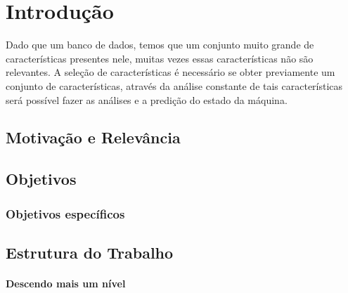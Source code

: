 \chapter{Introdução}
\begin{comment}
Segundo \cite{horn86robot}, todo triângulo equilátero tem os lados iguais. Já
segundo \cite{shashua97photometric}, todo quadrado também tem. \cite{Li2009}

Veja que o pacote \verb|natbib| permite uma série de formas diferentes para
fazer referências bibliográficas. O comando padrão, \verb|\cite|, realiza a
citação comum vista no parágrafo anterior. Outros comandos permitem, por
exemplo, citar somente o autor --- por exemplo, citar o trabalho de
\citeauthor{samaras99coupled} --- ou colocar automaticamente a citação entre
parênteses \citep{hougen93estimation, sato99illumination2, sato99illumination1,
sato01stability}. Os comandos usados foram, respectivamente, \verb|\citeauthor|
e \verb|\citep|. Veja a documentação do \verb|natbib| na Internet para conhecer
outros comandos e exemplos de uso. 

Citações aleatórias para fazer com que as referências bibliográficas ocupem
mais de uma página: \cite{bichsel92simple, dror01statistics, guisser92new}.
\end{comment}

Dado que um banco de dados, temos que um conjunto muito grande de características presentes nele, muitas vezes essas características não são relevantes. A seleção de características é necessário se obter previamente um conjunto de características, através da análise constante de tais características será possível fazer as análises e a predição do estado da máquina.

\section{Motivação e Relevância}

\dummytxtb\dummytxta

\section{Objetivos}

\dummytxtb\dummytxta

\subsection{Objetivos específicos}


\dummytxtc\dummytxtb

\section{Estrutura do Trabalho}

\dummytxta\dummytxtc

\subsubsection{Descendo mais um nível}

\dummytxtb\dummytxta
